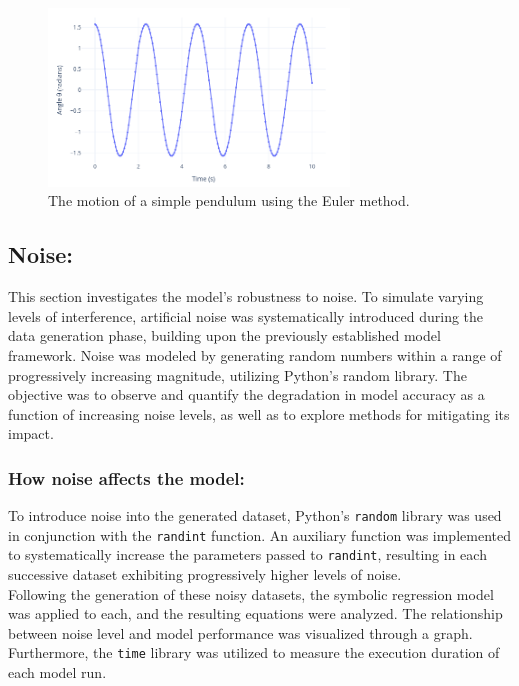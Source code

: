 \documentclass{article}
\begin{document}
\begin{figure}[H]
    \centering
    \includegraphics[width=8cm]{pendulum_simulation}
    \caption{The motion of a simple pendulum using the Euler method.} %
    \label{fig:sr_flow}
\end{figure}



\subsection{Noise: }


This section investigates the model's robustness to noise. To simulate varying levels of interference, artificial noise was systematically introduced during the data generation phase, building upon the previously established model framework. Noise was modeled by generating random numbers within a range of progressively increasing magnitude, utilizing Python's random library. The objective was to observe and quantify the degradation in model accuracy as a function of increasing noise levels, as well as to explore methods for mitigating its impact.\\



\subsubsection{How noise affects the model: }

To introduce noise into the generated dataset, Python’s \texttt{random} library was used in conjunction with the \texttt{randint} function. An auxiliary function was implemented to systematically increase the parameters passed to \texttt{randint}, resulting in each successive dataset exhibiting progressively higher levels of noise.\\

Following the generation of these noisy datasets, the symbolic regression model was applied to each, and the resulting equations were analyzed. The relationship between noise level and model performance was visualized through a graph. Furthermore, the \texttt{time} library was utilized to measure the execution duration of each model run.\\
\end{document}
